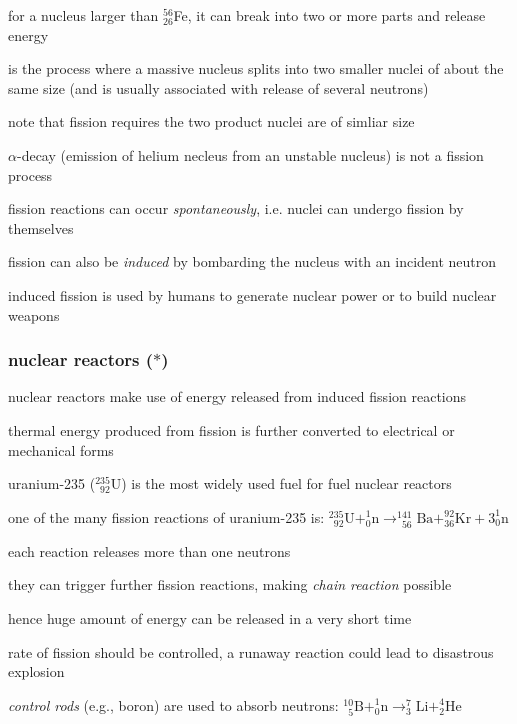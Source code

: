 for a nucleus larger than $^{56}_{26}$Fe, it can break into two or more parts and release energy

\begin{ilight}
	 is the process where a massive nucleus splits into two smaller nuclei of about the same size (and is usually associated with release of several neutrons)
\end{ilight}

\cmt note that fission requires the two product nuclei are of simliar size

$\alpha$-decay (emission of helium necleus from an unstable nucleus) is not a fission process

\cmt fission reactions can occur \emph{spontaneously}, i.e. nuclei can undergo fission by themselves

fission can also be \emph{induced} by bombarding the nucleus with an incident neutron

induced fission is used by humans to generate nuclear power or to build nuclear weapons

\subsubsection*{nuclear reactors ($\ast$)}

nuclear reactors make use of energy released from induced fission reactions

thermal energy produced from fission is further converted to electrical or mechanical forms

uranium-235 ($^{235}_{\phantom{1}92}\text{U}$) is the most widely used fuel for fuel nuclear reactors

one of the many fission reactions of uranium-235 is: $^{235}_{\phantom{1}92}\text{U} + ^1_0\text{n} \longrightarrow  ^{141}_{\phantom{1}56}\text{Ba} + ^{92}_{36}\text{Kr} + 3^1_0\text{n}$

\cmt each reaction releases more than one neutrons

they can trigger further fission reactions, making \emph{chain reaction} possible

hence huge amount of energy can be released in a very short time

\cmt rate of fission should be controlled, a runaway reaction could lead to disastrous explosion

\emph{control rods} (e.g., boron) are used to absorb neutrons: $^{10}_{\phantom{1}5}\text{B} + ^1_0\text{n} \longrightarrow  ^{7}_{3}\text{Li} + ^{4}_{2}\text{He}$

